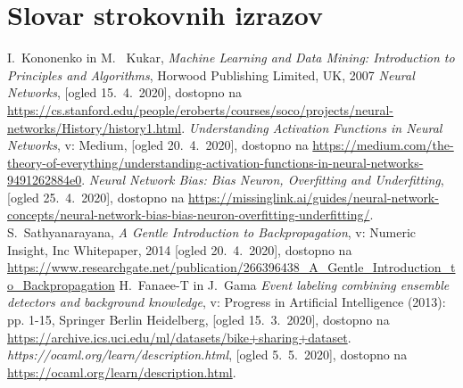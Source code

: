 \documentclass[mat1]{fmfdelo}
\begin{document}
\section*{Slovar strokovnih izrazov}
%


\begin{thebibliography}{99}
%
I.~Kononenko in M.~ Kukar, \emph{Machine Learning and Data Mining: Introduction to Principles and Algorithms}, Horwood Publishing Limited, UK, 2007
%
\emph{Neural Networks}, [ogled 15.~4.~2020], dostopno na \url{https://cs.stanford.edu/people/eroberts/courses/soco/projects/neural-networks/History/history1.html}.
%
\emph{Understanding Activation Functions in Neural Networks}, v: Medium, [ogled 20.~4.~2020], dostopno na \url{https://medium.com/the-theory-of-everything/understanding-activation-functions-in-neural-networks-9491262884e0}.
%
\emph{Neural Network Bias: Bias Neuron, Overfitting and Underfitting}, [ogled 25.~4.~2020], dostopno na \url{https://missinglink.ai/guides/neural-network-concepts/neural-network-bias-bias-neuron-overfitting-underfitting/}.
%
S.~Sathyanarayana, \emph{A Gentle Introduction to Backpropagation}, v: Numeric Insight, Inc Whitepaper, 2014 [ogled 20.~4.~2020], dostopno na \url{https://www.researchgate.net/publication/266396438_A_Gentle_Introduction_to_Backpropagation}
%
H.~Fanaee-T in J.~Gama \emph{Event labeling combining ensemble detectors and background knowledge}, v:  Progress in Artificial Intelligence (2013): pp. 1-15, Springer Berlin Heidelberg, [ogled 15.~3.~2020], dostopno na \url{https://archive.ics.uci.edu/ml/datasets/bike+sharing+dataset}.
%
 \emph{https://ocaml.org/learn/description.html}, [ogled 5.~5.~2020], dostopno na \url{https://ocaml.org/learn/description.html}.
\end{thebibliography}
\end{document}
